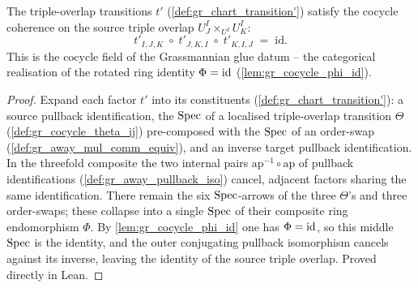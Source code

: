 \begin{lemma}\leanok
  \label{lem:gr_chartTransition'_cocycle}
  The triple-overlap transitions \(t'\) (\cref{def:gr_chart_transition'}) satisfy
  the cocycle coherence on the source triple overlap \(U^I_J \times_{U^I} U^I_K\):
  \[
    t'_{I,J,K} \;\circ\; t'_{J,K,I} \;\circ\; t'_{K,I,J} \;=\; \mathrm{id}.
  \]
  This is the \(\mathrm{cocycle}\) field of the Grassmannian glue datum -- the
  categorical realisation of the rotated ring identity \(\Phi = \operatorname{id}\)
  (\cref{lem:gr_cocycle_phi_id}).
\end{lemma}
\begin{proof}
  \leanok
  Expand each factor \(t'\) into its constituents
  (\cref{def:gr_chart_transition'}): a source pullback identification, the
  \(\operatorname{Spec}\) of a localised triple-overlap transition \(\Theta\)
  (\cref{def:gr_cocycle_theta_ij}) pre-composed with the \(\operatorname{Spec}\) of an
  order-swap (\cref{def:gr_away_mul_comm_equiv}), and an inverse target pullback
  identification. In the threefold composite the two internal pairs
  \(\mathrm{ap}^{-1} \circ \mathrm{ap}\) of pullback identifications
  (\cref{def:gr_away_pullback_iso}) cancel, adjacent factors sharing the same
  identification. There remain the six \(\operatorname{Spec}\)-arrows of the three \(\Theta\)'s
  and three order-swaps; these collapse into a single \(\operatorname{Spec}\) of their composite
  ring endomorphism \(\Phi\). By \cref{lem:gr_cocycle_phi_id} one has
  \(\Phi = \operatorname{id}\), so this middle \(\operatorname{Spec}\) is the identity, and the outer
  conjugating pullback isomorphism cancels against its inverse, leaving the
  identity of the source triple overlap. Proved directly in Lean.
\end{proof}


